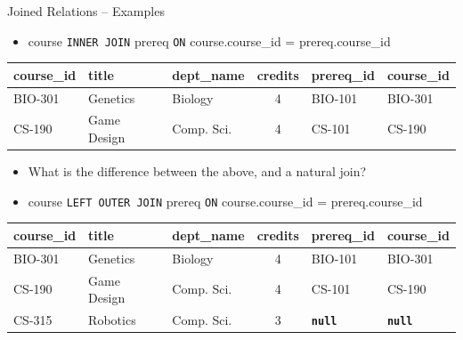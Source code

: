 \documentclass{beamer}
\begin{document}
\begin{frame}{Joined Relations – Examples}
    \normalsize
    \begin{itemize}
        \item course \texttt{INNER JOIN} prereq \texttt{ON} course.course\_id = prereq.course\_id
    \end{itemize}
    \scriptsize
    \begin{tabular}{| l | l | l | c | l | l |}
        \hline
        \textbf{course\_id} & \textbf{title} & \textbf{dept\_name} & \textbf{credits} & \textbf{prereq\_id} & \textbf{course\_id} \\
        \hline
        BIO-301 & Genetics    & Biology    & 4 & BIO-101 & BIO-301 \\
        \hline
        CS-190  & Game Design & Comp. Sci. & 4 & CS-101  & CS-190  \\
        \hline
    \end{tabular}
    \normalsize
    \begin{itemize}
        \item What is the difference between the above, and a natural join?
        \vspace{5mm}
        \item course \texttt{LEFT OUTER JOIN} prereq \texttt{ON} course.course\_id = prereq.course\_id
    \end{itemize}
    \scriptsize
    \begin{tabular}{| l | l | l | c | l | l |}
        \hline
        \textbf{course\_id} & \textbf{title} & \textbf{dept\_name} & \textbf{credits} & \textbf{prereq\_id} & \textbf{course\_id} \\
        \hline
        BIO-301 & Genetics    & Biology    & 4 & BIO-101 & BIO-301 \\
        \hline
        CS-190  & Game Design & Comp. Sci. & 4 & CS-101 & CS-190  \\
        \hline
        CS-315  & Robotics    & Comp. Sci. & 3 & \textbf{\texttt{null}} & \textbf{\texttt{null}} \\
        \hline
    \end{tabular}
\end{frame}
\end{document}
